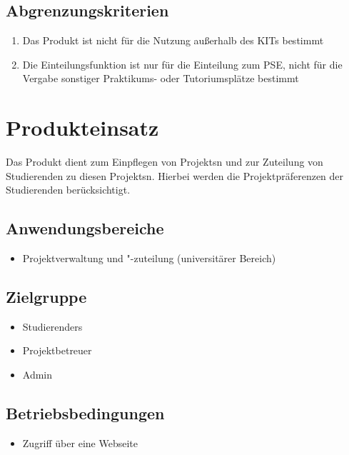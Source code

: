 \documentclass[parskip=full]{scrartcl}
\newcommand{\swtLabel}[1]{\textbf{/#1\arabic*0/}}
\begin{document}
\subsection{Abgrenzungskriterien}
\begin{enumerate}[label=\swtLabel{AG}]
 
  \item Das Produkt ist nicht für die Nutzung außerhalb des KITs bestimmt %

\item Die Einteilungsfunktion ist nur für die Einteilung zum \gls{PSE}, nicht
für die Vergabe sonstiger Praktikums- oder Tutoriumsplätze bestimmt
  
\end{enumerate}
\section{Produkteinsatz}
Das Produkt dient zum Einpflegen von \glspl{Projekt}n und zur Zuteilung von
Studierenden zu diesen \glspl{Projekt}n. Hierbei werden die Projektpräferenzen der
Studierenden berücksichtigt.


\subsection{Anwendungsbereiche}

\begin{itemize} 
  \item Projektverwaltung und "-zuteilung (universitärer Bereich) %
\end{itemize}

\subsection{Zielgruppe}
\begin{itemize} 
  \item \glspl{Studierender}
  \item \gls{Projektbetreuer}
  \item \gls{Admin}
\end{itemize}

\subsection{Betriebsbedingungen}
\begin{itemize} 
  \item Zugriff über eine Webseite
\end{itemize}
\end{document}

